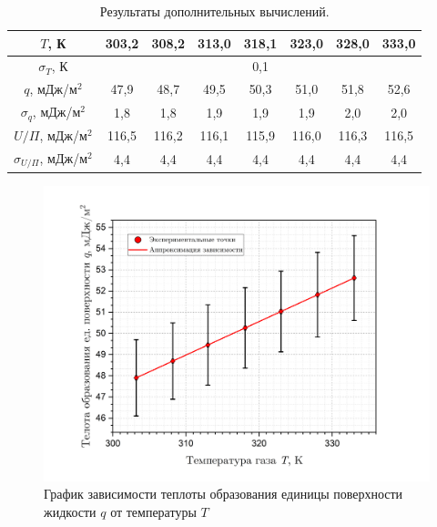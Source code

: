 \documentclass[a4paper, 12pt]{article}
\begin{document}
    \begin{table}[H]
        \centering
        \begin{tabular}{|c|ccccccc|}
        \hline
        $T$, К  & \multicolumn{1}{c|}{303,2} & \multicolumn{1}{c|}{308,2} & \multicolumn{1}{c|}{313,0} & \multicolumn{1}{c|}{318,1} & \multicolumn{1}{c|}{323,0} & \multicolumn{1}{c|}{328,0} & 333,0 \\ \hline
        $\sigma_T$, К & \multicolumn{7}{c|}{0,1} \\ \hline
        $q$, мДж/${\text{м}}^2$ & \multicolumn{1}{c|}{47,9} & \multicolumn{1}{c|}{48,7} & \multicolumn{1}{c|}{49,5} & \multicolumn{1}{c|}{50,3} & \multicolumn{1}{c|}{51,0} & \multicolumn{1}{c|}{51,8} & 52,6 \\ \hline
        $\sigma_q$, мДж/${\text{м}}^2$ & \multicolumn{1}{c|}{1,8} & \multicolumn{1}{c|}{1,8} & \multicolumn{1}{c|}{1,9} & \multicolumn{1}{c|}{1,9} & \multicolumn{1}{c|}{1,9} & \multicolumn{1}{c|}{2,0} & 2,0 \\ \hline
        $U/\Pi$, мДж/${\text{м}}^2$ & \multicolumn{1}{c|}{116,5} & \multicolumn{1}{c|}{116,2} & \multicolumn{1}{c|}{116,1} & \multicolumn{1}{c|}{115,9} & \multicolumn{1}{c|}{116,0} & \multicolumn{1}{c|}{116,3} & 116,5 \\ \hline
        $\sigma_{U/\Pi}$, мДж/${\text{м}}^2$ & \multicolumn{1}{c|}{4,4} & \multicolumn{1}{c|}{4,4} & \multicolumn{1}{c|}{4,4} & \multicolumn{1}{c|}{4,4} & \multicolumn{1}{c|}{4,4} & \multicolumn{1}{c|}{4,4} & 4,4 \\ \hline
        \end{tabular}
        \caption{Результаты дополнительных вычислений.}
        \label{table:Graph_2-3}
    \end{table}

     \begin{figure}[H]
        \centering
        \includegraphics[width=12cm]{images/q(T).png}
        \caption{График зависимости теплоты образования единицы поверхности жидкости $q$ от температуры $T$}
        \label{fig:q(T)}
    \end{figure}
    
\end{document}
